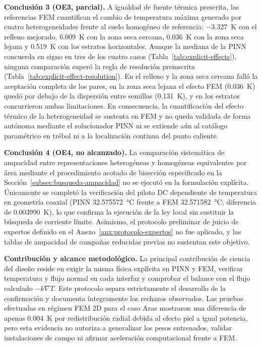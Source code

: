 \textbf{Conclusión 3 (OE3, parcial).} A igualdad de fuente térmica prescrita, las referencias FEM cuantifican el cambio de temperatura máxima generado por cuatro heterogeneidades frente al suelo homogéneo de referencia: \SI{-3,327}{\kelvin} con el relleno mejorado, \SI{+6,009}{\kelvin} con la zona seca cercana, \SI{+0,036}{\kelvin} con la zona seca lejana y \SI{+0,519}{\kelvin} con los estratos horizontales. Aunque la mediana de la PINN concuerda en signo en tres de los cuatro casos (Tabla~\ref{tab:explicit-effects}), ninguna comparación superó la regla de resolución preinscrita (Tabla~\ref{tab:explicit-effect-resolution}). En el relleno y la zona seca cercana falló la aceptación completa de los pares, en la zona seca lejana el efecto FEM (\SI{0,036}{\kelvin}) quedó por debajo de la dispersión entre semillas (\SI{0,131}{\kelvin}), y en los estratos concurrieron ambas limitaciones. En consecuencia, la cuantificación del efecto térmico de la heterogeneidad se sustenta en FEM y no queda validada de forma autónoma mediante el solucionador PINN ni se extiende aún al catálogo paramétrico en trébol ni a la localización continua del punto caliente.

\textbf{Conclusión 4 (OE4, no alcanzado).} La comparación sistemática de ampacidad entre representaciones heterogéneas y homogéneas equivalentes por área mediante el procedimiento acotado de bisección especificado en la Sección~\ref{subsec:busqueda-ampacidad} no se ejecutó en la formulación explícita. Únicamente se completó la verificación del piloto DC dependiente de temperatura en geometría coaxial (PINN \SI{32,575572}{\celsius} frente a FEM \SI{32,571582}{\celsius}; diferencia de \SI{0,003990}{\kelvin}), lo que confirma la ejecución de la ley local sin sustituir la búsqueda de corriente límite. Asimismo, el protocolo preliminar de juicio de expertos definido en el Anexo~\ref{anx:protocolo-expertos} no fue aplicado, y las tablas de ampacidad de campañas reducidas previas no sustentan este objetivo.

\textbf{Contribución y alcance metodológico.} La principal contribución de ciencia del diseño reside en exigir la misma física explícita en PINN y FEM, verificar temperatura y flujo normal en cada interfaz y comprobar el balance con el flujo calculado $-k\nabla T$. Este protocolo separa estrictamente el desarrollo de la confirmación y documenta íntegramente los rechazos observados. Las pruebas efectuadas en régimen FEM 2D para el caso Aras mostraron una diferencia de apenas \SI{0,004}{\kelvin} por redistribución radial debida al efecto piel a igual potencia, pero esta evidencia no autoriza a generalizar los pesos entrenados, validar instalaciones de campo ni afirmar aceleración computacional frente a FEM.

